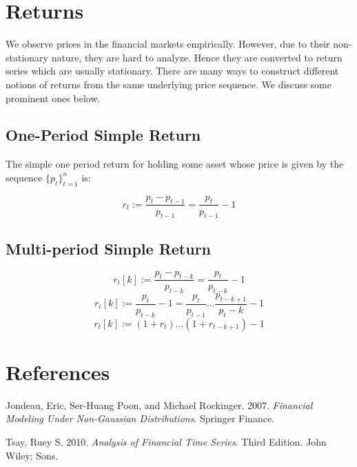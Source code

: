 \documentclass[11pt,]{article}
\begin{document}
\section{Returns}\label{returns}

We observe prices in the financial markets empirically. However, due to
their non-stationary nature, they are hard to analyze. Hence they are
converted to return series which are usually stationary. There are many
ways to construct different notions of returns from the same underlying
price sequence. We discuss some prominent ones below.

\subsection{One-Period Simple Return}\label{one-period-simple-return}

The simple one period return for holding some asset whose price is given
by the sequence \(\{p_t\}_{t=1}^n\) is:

\[r_t := \frac{p_t-p_{t-1}}{p_{t-1}} = \frac{p_t}{p_{t-1}}-1\]

\subsection{Multi-period Simple
Return}\label{multi-period-simple-return}

\[r_t[k] := \frac{p_t-p_{t-k}}{p_{t-k}} = \frac{p_t}{p_{t-k}}-1\]
\[r_t[k] := \frac{p_t}{p_{t-k}}-1 = 
\frac{p_t}{p_{t-1}}\hdots\frac{p_{t-k+1}}{p_t-k}-1\]
\[r_t[k] := (1+r_t)\hdots(1+r_{t-k+1})-1\]

\section*{References}\label{references}

\hypertarget{refs}{}
\hypertarget{ref-Jondeau_Poon_Rockinger:2007}{}
Jondeau, Eric, Ser-Huang Poon, and Michael Rockinger. 2007.
\emph{Financial Modeling Under Non-Gaussian Distributions}. Springer
Finance.

\hypertarget{ref-Tsay:2010}{}
Tsay, Ruey S. 2010. \emph{Analysis of Financial Time Series}. Third
Edition. John Wiley; Sons.
\end{document}
